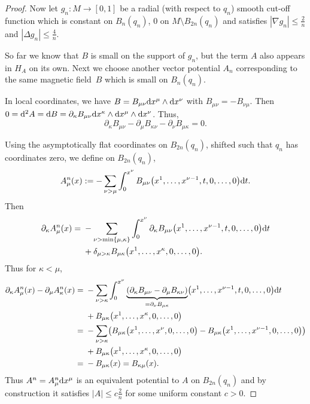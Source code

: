 \documentclass[pdftex]{sigma}
\numberwithin{equation}{section}
\begin{document}
\begin{proof}
Now let $g_n\colon M\to [0,1]$ be a radial (with respect to $q_n$) smooth cut-off function which is constant on $B_{n}(q_n)$, $0$ on $M\setminus B_{2n}(q_n)$ and satisfies $| \nabla g_n| \leq \frac{2}{n}$ and $|\Delta g_n| \leq \frac{4}{n}$.
	
So far we know that $B$ is small on the support of $g_n$, but the term $A$ also appears in $H_A$ on its own. Next we choose another vector potential $A_n$ corresponding to the same magnetic field~$B$ which is small on $B_{n}(q_n)$.
	
In local coordinates, we have $B=B_{\mu\nu} {\rm d}x^\mu \wedge {\rm d}x^\nu$ with $B_{\mu\nu}=-B_{\nu\mu}$. Then $0={\rm d}^2A={\rm d}B= \partial_\kappa B_{\mu\nu} {\rm d}x^\kappa \wedge {\rm d}x^\mu \wedge {\rm d}x^\nu$. Thus,
\[ \partial_\kappa B_{\mu\nu} - \partial_\mu B_{\kappa\nu} -\partial_\nu B_{\mu\kappa}=0.\]
	
Using the asymptotically flat coordinates on $B_{2n}(q_n)$, shifted such that $q_n$ has coordinates zero, we define on $B_{2n}(q_n)$,
\begin{align*}
A_\mu^n(x) := -\sum_{\nu>\mu} \int_0^{x^\nu} B_{\mu\nu}\bigl(x^1, \ldots, x^{\nu-1}, t, 0, \ldots, 0\bigr)  {\rm d}t.
\end{align*}	
Then
\begin{align*}
\partial_\kappa A_\mu^n(x) ={} & -\sum_{\nu>\min \{\mu, \kappa\}} \int_0^{x^\nu} \partial_\kappa B_{\mu\nu}\bigl(x^1, \ldots, x^{\nu-1}, t, 0, \ldots, 0\bigr) {\rm d}t\\& + \delta_{\mu>\kappa} B_{\mu\kappa}\bigl(x^1, \ldots, x^{\kappa}, 0, \ldots, 0\bigr). \end{align*}
Thus for $\kappa<\mu$,
\begin{align*}
\partial_\kappa A_\mu^n(x) - \partial_\mu A_\kappa^n(x)
={} & -\sum_{\nu> \kappa} \int_0^{x^\nu} \underbrace{(\partial_\kappa B_{\mu\nu} -\partial_\mu B_{\kappa\nu})}_{=\partial_\nu B_{\mu\kappa}}\bigl(x^1, \ldots, x^{\nu-1}, t, 0, \ldots, 0\bigr) {\rm d}t\\& + B_{\mu\kappa}\bigl(x^1, \ldots, x^{\kappa}, 0, \ldots, 0\bigr) \\
={} &- \sum_{\nu> \kappa} \bigl( B_{\mu\kappa}\bigl(x^1, \ldots, x^{\nu}, 0, \ldots, 0\bigr)- B_{\mu\kappa}\bigl(x^1, \ldots, x^{\nu-1}, 0, \ldots, 0\bigr) \bigr)\\&
+ B_{\mu\kappa}\bigl(x^1, \ldots, x^{\kappa}, 0, \ldots, 0\bigr) \\ ={}& -B_{\mu\kappa}(x)=B_{\kappa\mu}(x).
\end{align*}
Thus $A^n=A^n_\mu {\rm d}x^\mu$ is an equivalent potential to $A$ on $B_{2n}(q_n)$ and by construction it satisfies $|A|\leq c\frac{2}{n}$ for some uniform constant $c>0$.
		

\end{proof}
\end{document}
